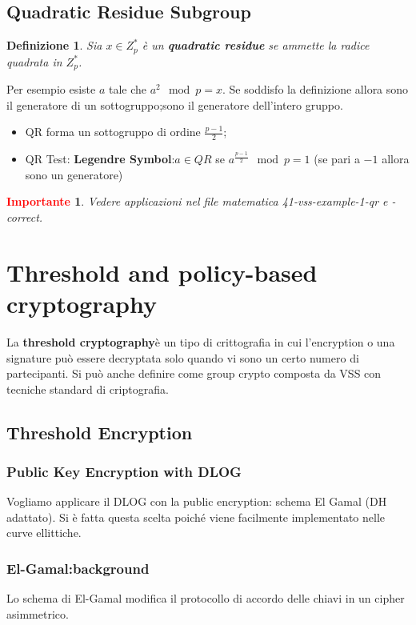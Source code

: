 \documentclass{book}
\newtheorem{Definizione}{\textbf{Definizione}}
\newtheorem*{Importante}{\textbf{\textcolor{red}{Importante}}}
\begin{document}
\section{Quadratic Residue Subgroup}
\begin{Definizione}
	Sia \(x\in Z_{p}^{*}\) è un \textbf{quadratic residue} se ammette la radice quadrata in \(Z_{p}^{*}\).
\end{Definizione}
Per esempio esiste \(a\) tale che \(a^{2}\mod{p}=x\).\newline
Se soddisfo la definizione allora sono il generatore di un sottogruppo;\@altrimenti sono il generatore dell'intero gruppo.
\begin{itemize}
	\item QR forma un sottogruppo di ordine \(\frac{p-1}{2}\);
	\item QR Test: \textbf{Legendre Symbol}:\(a\in QR\) se \(a^{\frac{p-1}{2}}\mod{p}=1\) (se pari a \(-1\) allora sono un generatore)
\end{itemize}
\begin{Importante}
	Vedere applicazioni nel file matematica 41-vss-example-1-qr e -correct.
\end{Importante}
\chapter{Threshold and policy-based cryptography}
La \textbf{threshold cryptography}è un tipo di crittografia in cui l'encryption o una signature può essere decryptata solo quando vi sono un certo numero di partecipanti. Si può anche definire come group crypto composta da VSS con tecniche standard di criptografia\@.
\section{Threshold Encryption}
\subsection{Public Key Encryption with DLOG}
Vogliamo applicare il DLOG con la public encryption: schema El Gamal (DH adattato)\@. Si è fatta questa scelta poiché viene facilmente implementato nelle curve ellittiche\@.
\subsection{El-Gamal:background}
Lo schema di El-Gamal modifica il protocollo di accordo delle chiavi in un cipher asimmetrico\@.
\end{document}
